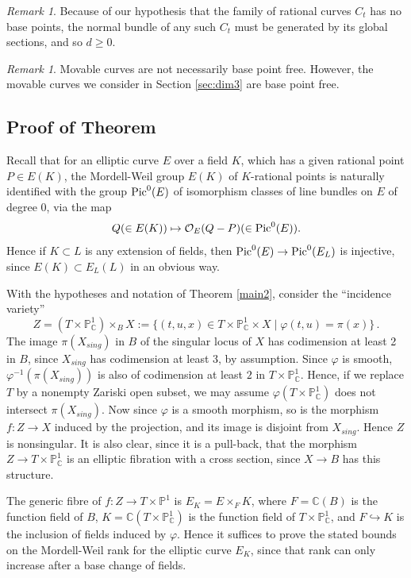 \documentclass[11pt]{amsart}
\theoremstyle{definition}
\theoremstyle{definition}
\theoremstyle{remark}
\newtheorem{remark}[theorem]{Remark}
\theoremstyle{remark}
\theoremstyle{definition}
\theoremstyle{conjecture}
\begin{document}
\begin{remark}
Because of our hypothesis that the family of rational curves $C_t$ has no base points,
the normal bundle of any such $C_t$ must be generated by its global sections,
and so $d\geq 0$.
\end{remark}

\begin{remark} 
Movable curves are not necessarily base point free. However, the movable curves  we consider in Section \ref{sec:dim3} are base point free.
\end{remark}






\subsection{Proof of Theorem \protect{\ref{main2}}}


Recall that for an elliptic curve $E$ over a field $K$,
which has a given rational point $P\in E(K)$,
the Mordell-Weil group $E(K)$ of $K$-rational points is naturally identified
with the group ${\rm Pic}^0(E)$ of isomorphism classes of line bundles on $E$ of degree 0,
via the map
\[
Q (\in E(K))\mapsto {\mathcal O}_E(Q-P) (\in {\rm Pic}^0(E)).
\]
Hence if $K\subset L$ is any extension of fields,
then ${\rm Pic}^0(E)\to {\rm Pic}^0(E_L)$ is injective,
since $E(K)\subset E_L(L)$ in an obvious way.


With the hypotheses and notation of Theorem \ref{main2},
consider the ``incidence variety''
\[
Z=(T\times{\mathbb P}^1_{\mathbb C})\times_BX:=
\{(t,u,x)\in T\times{\mathbb P}^1_{\mathbb C}\times X\mid \varphi(t,u)=\pi(x)\} \,.
\]
The image $\pi(X_{sing})$ in $B$ of the singular locus of $X$ has codimension at least 2 in $B$,
since $X_{sing}$ has codimension at least 3, by assumption.
Since $\varphi$ is smooth,
$\varphi^{-1}(\pi(X_{sing}))$ is also of codimension at least $2$
in $T\times{\mathbb P}^1_{\mathbb C}$.
Hence, if we replace $T$ by a nonempty Zariski open subset,
we may assume $\varphi(T\times{\mathbb P}^1_{\mathbb C})$
does not intersect  $\pi(X_{sing})$.
Now since $\varphi$ is a smooth morphism,
so is the morphism $f:Z\to X$ induced by the projection,
and its image is disjoint from $X_{sing}$.
Hence $Z$ is nonsingular. It is also clear, since it is a pull-back,
that the morphism $Z\to T\times{\mathbb P}^1_{\mathbb C}$
is an elliptic fibration with a cross section, since $X\to B$ has this structure.

The generic fibre of $f:Z\to T\times{\mathbb P}^1$ is $E_K=E\times_F K$,
where $F={\mathbb C}(B)$ is the function field of $B$,
$K={\mathbb C}(T\times{\mathbb P}^1_{\mathbb C})$
is the function field of $T\times{\mathbb P}^1_{\mathbb C}$,
and $F\hookrightarrow K$ is the inclusion of fields induced by $\varphi$.
Hence it suffices to prove the stated bounds on the Mordell-Weil rank for the elliptic curve $E_K$, since that rank can only increase after a base change of fields.
\end{document}

